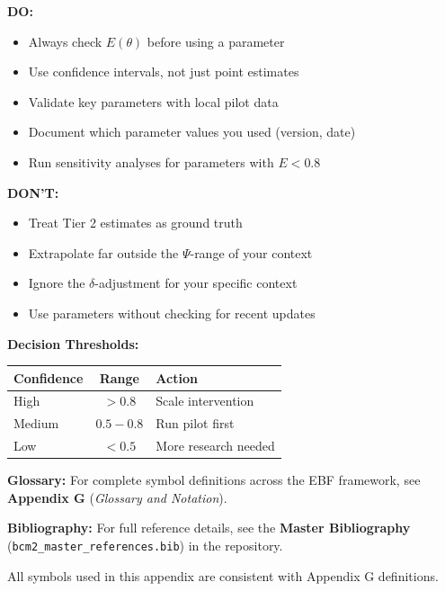 \documentclass[11pt,a4paper]{article}
\theoremstyle{definition}
\begin{document}
\begin{tcolorbox}[colback=yellow!5!white, colframe=yellow!75!black, 
    title=\textbf{For Practitioners: Using BBB Estimates}]

\textbf{DO:}
\begin{itemize}[nosep]
    \item Always check $E(\theta)$ before using a parameter
    \item Use confidence intervals, not just point estimates
    \item Validate key parameters with local pilot data
    \item Document which parameter values you used (version, date)
    \item Run sensitivity analyses for parameters with $E < 0.8$
\end{itemize}

\textbf{DON'T:}
\begin{itemize}[nosep]
    \item Treat Tier 2 estimates as ground truth
    \item Extrapolate far outside the $\Psi$-range of your context
    \item Ignore the $\delta$-adjustment for your specific context
    \item Use parameters without checking for recent updates
\end{itemize}

\textbf{Decision Thresholds:}
\begin{center}
\begin{tabular}{@{}lcl@{}}
\toprule
\textbf{Confidence} & \textbf{Range} & \textbf{Action} \\
\midrule
High & $> 0.8$ & Scale intervention \\
Medium & $0.5 - 0.8$ & Run pilot first \\
Low & $< 0.5$ & More research needed \\
\bottomrule
\end{tabular}
\end{center}

\end{tcolorbox}





\begin{tcolorbox}[colback=blue!5!white, colframe=blue!75!black, 
    title=\textbf{Central References}]

\textbf{Glossary:} For complete symbol definitions across the EBF framework, 
see \textbf{Appendix G} (\textit{Glossary and Notation}).

\textbf{Bibliography:} For full reference details, see the 
\textbf{Master Bibliography} (\texttt{bcm2\_master\_references.bib}) 
in the repository.

All symbols used in this appendix are consistent with Appendix G definitions.

\end{tcolorbox}
\end{document}
